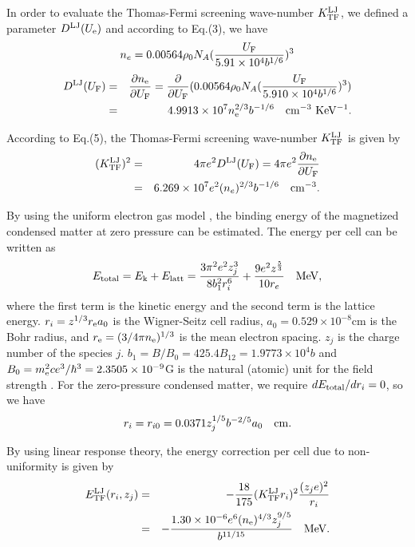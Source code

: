 \documentclass[manuscript]{aastex}
\begin{document}
In order to evaluate the Thomas-Fermi screening wave-number
$K_{{\rm{TF}}}^{{\rm{LJ}}}$, we defined a parameter
$D^{{\rm{LJ}}}(U_{\rm{e}})$ and according to Eq.(3), we have
\begin{equation}
n_e=0.00564\rho_0 N_A(\frac{U_{\rm{F}}}{5.91\times 10^4b^{1/6}})^3
\label{6}
\end{equation}
\begin{eqnarray}
 D^{{\rm{LJ}}}(U_{\rm{F}})&=&\frac{\partial n_{\rm{e}}}{\partial U_{\rm{F}}}=\frac{\partial}{\partial U_{\rm{F}}}(0.00564\rho_0 N_A(\frac{U_{\rm{F}}}{5.910\times 10^4b^{1/6}})^3)\nonumber\\
 &=&4.9913\times10^{7}n_{\rm{e}}^{2/3}b^{-1/6}~~~\rm{cm^{-3}~KeV^{-1}}.
 \label{6}
\end{eqnarray}

According to Eq.(5), the Thomas-Fermi screening wave-number
$K_{{\rm{TF}}}^{{\rm{LJ}}}$ is given by \citep{Ashcroft76}
\begin{eqnarray}
(K_{{\rm{TF}}}^{{\rm{LJ}}})^2&=&4\pi e^2 D^{{\rm{LJ}}}(U_{\rm{F}})
 =4\pi e^2\frac{\partial n_{\rm{e}}}{\partial U_{\rm{F}}}\nonumber\\
 &=&6.269\times10^{7}e^2(n_e)^{2/3}b^{-1/6}~~~\rm{cm^{-3}}.
 \label{8}
\end{eqnarray}

By using the uniform electron gas model \citep{Kadomtsev71}, the
binding energy of the magnetized condensed matter at zero pressure
can be estimated. The energy per cell can be written as
\begin{equation}
E_{\rm{total}}=E_{\rm{k}}+E_{\rm{latt}}=\frac{3\pi^2e^2z_{j}^3}{8b_1^2r_{i}^6}+\frac{9e^2z^{\frac{5}{3}}}{10r_e}~~~\rm{MeV},
 \label{9}
\end{equation}
where the first term is the kinetic energy and the second term is
the lattice energy. $r_{i}=z^{1/3}r_{\rm{e}} a_0$ is the
Wigner-Seitz cell radius, $a_0=0.529\times10^{-8}$cm is the Bohr
radius, and $r_{\rm{e}}=(3/4\pi n_{\rm{e}})^{1/3}$ is the mean
electron spacing. $z_{j}$ is the charge number of the species $j$.
$b_1=B/B_0=425.4B_{12}=1.9773\times10^4b$ and
$B_0=m_{\rm{e}}^2ce^3/\hbar^3=2.3505\times10^{-9}$G  is  the natural
(atomic) unit for the field strength \citep{Lai01}. For the
zero-pressure condensed matter, we require $dE_{\rm{total}}/dr_i=0$,
so we have
\begin{equation}
r_i=r_{i0}=0.0371z_j^{1/5}b^{-2/5}a_0~~~\rm{cm}. \label{10}
\end{equation}

By using linear response theory, the energy correction per cell due
to non-uniformity is given by \citep{Lattimer85}
\begin{eqnarray}
E_{{\rm{TF}}}^{{\rm{LJ}}}(r_i,z_j)&=&-\frac{18}{175}(K_{{\rm{TF}}}^{{\rm{LJ}}}r_i)^2\frac{(z_je)^2}{r_i}\nonumber\\
&=&-\frac{1.30\times10^{-6}e^6(n_{\rm{e}})^{4/3}z_{j}^{9/5}}{b^{11/15}}~~~\rm{MeV}.
\label{11}
\end{eqnarray}
\end{document}
